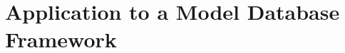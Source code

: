 \documentclass[runningheads]{llncs}
\begin{document}


\section{Application to a Model Database Framework}
\label{sec:database}

\end{document}
